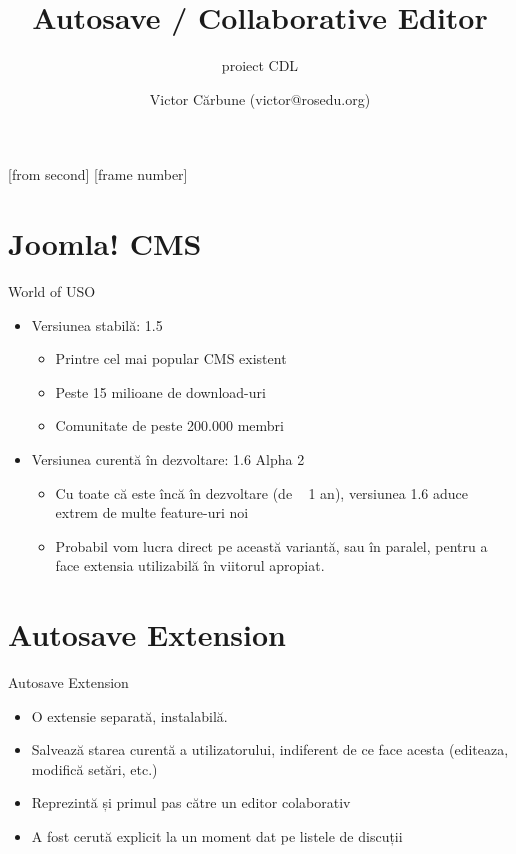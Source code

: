\documentclass{beamer}
\title[Autosave / Collaborative Editor]{Autosave / Collaborative Editor}
\subtitle{proiect CDL}
\institute[Joomla!]{Joomla!}
\author[Victor C]{Victor Cărbune (victor@rosedu.org)}
\begin{document}
[from second]
[frame number]

\frame{\titlepage}

\section{Joomla! CMS}


\begin{frame}{World of USO}
\begin{itemize}
	\item Versiunea stabilă: 1.5
		\begin{itemize}
		\pause
		\item Printre cel mai popular CMS existent		
		\pause
		\item Peste 15 milioane de download-uri
 		\pause
		\item Comunitate de peste 200.000 membri
		\end{itemize}
 	\pause
	\item Versiunea curentă în dezvoltare: 1.6 Alpha 2
		\begin{itemize}	
		\pause	
		\item Cu toate că este încă în dezvoltare (de ~ 1 an), versiunea 1.6 aduce extrem de multe feature-uri noi 
		\pause	
		\item Probabil vom lucra direct pe această variantă, sau în paralel, pentru a face extensia utilizabilă în viitorul apropiat.
		\end{itemize}
\end{itemize}
\end{frame}

\section{Autosave Extension}

\begin{frame}{Autosave Extension}
  \begin{itemize}
    \pause	
    \item O extensie separată, instalabilă.
    \pause	
    \item Salvează starea curentă a utilizatorului, indiferent de ce face acesta (editeaza, modifică setări, etc.)
    \pause
    \item Reprezintă și primul pas către un editor colaborativ
    \pause
    \item A fost cerută explicit la un moment dat pe listele de discuții
    \pause
  \end{itemize}
\end{frame}
\end{document}
